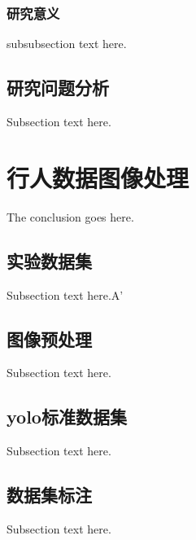 \documentclass[journal]{IEEEtran}
\begin{document}
\subsubsection{研究意义}
subsubsection text here.

\subsection{研究问题分析}
Subsection text here.

\section{行人数据图像处理}
The conclusion goes here.

\subsection{实验数据集}
Subsection text here.A'
\subsection{图像预处理}
Subsection text here.
\subsection{yolo标准数据集}
Subsection text here.
\subsection{数据集标注}
Subsection text here.

\end{document}
